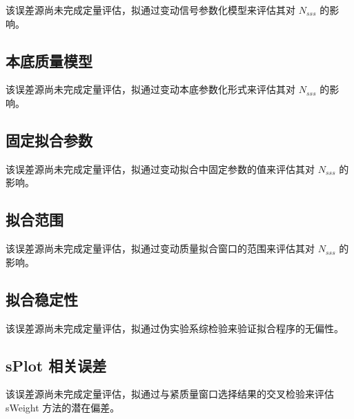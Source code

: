 该误差源尚未完成定量评估，拟通过变动信号参数化模型来评估其对 $N_{sss}$ 的影响。

\subsection{本底质量模型}
\label{subsec:syst-background-model}

该误差源尚未完成定量评估，拟通过变动本底参数化形式来评估其对 $N_{sss}$ 的影响。

\subsection{固定拟合参数}
\label{subsec:syst-fixed-parameters}

该误差源尚未完成定量评估，拟通过变动拟合中固定参数的值来评估其对 $N_{sss}$ 的影响。

\subsection{拟合范围}
\label{subsec:syst-fit-range}

该误差源尚未完成定量评估，拟通过变动质量拟合窗口的范围来评估其对 $N_{sss}$ 的影响。

\subsection{拟合稳定性}
\label{subsec:syst-fit-stability}

该误差源尚未完成定量评估，拟通过伪实验系综检验来验证拟合程序的无偏性。

\subsection{sPlot 相关误差}
\label{subsec:syst-splot}

该误差源尚未完成定量评估，拟通过与紧质量窗口选择结果的交叉检验来评估 sWeight 方法的潜在偏差。

